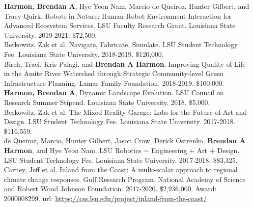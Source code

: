 \documentclass[10pt]{developercv} %
\begin{document}
\textbf{Harmon, Brendan A}, Hye Yeon Nam, Marcio de Queiroz, Hunter Gilbert, and Tracy Quirk. 
Robots in Nature: Human-Robot-Environment Interaction for Advanced Ecosystem Services. 
LSU Faculty Research Grant. Louisiana State University. 
2019-2021. \$72,500.\\

Berkowitz, Zak et al. Navigate, Fabricate, Simulate. 
LSU Student Technology Fee. Louisiana State University. 
2018-2019.	\$120,000.\\

Birch, Traci, Kris Palagi, and \textbf{Brendan A Harmon}. 
Improving Quality of Life in the Amite River Watershed through Strategic Community-level Green Infrastructure Planning. 
Lamar Family Foundation. 
2018-2019. \$100,000.\\

\textbf{Harmon, Brendan A}, 
Dynamic Landscape Evolution. 
LSU Council on Research Summer Stipend. Louisiana State University. 
2018. \$5,000.\\

Berkowitz, Zak et al. 
The Mixed Reality Garage: Labs for the Future of Art and Design. 
LSU Student Technology Fee. Louisiana State University. 
2017-2018. \$116,559.\\

de Queiroz, Marcio, Hunter Gilbert, Jason Crow, Derick Ostrenko, \textbf{Brendan A Harmon}, and Hye Yeon Nam. 
LSU Robotics = Engineering + Art + Design. 
LSU Student Technology Fee. Louisiana State University. 
2017-2018. \$83,325.\\

Carney, Jeff et al. 
Inland from the Coast: A multi-scalar approach to regional climate change responses. 
Gulf Research Program. National Academy of Science and Robert Wood Johnson Foundation.
2017-2020. \$2,936,000. Award: 2000008299.
url: \url{https://css.lsu.edu/project/inland-from-the-coast/}\\

\end{document}
